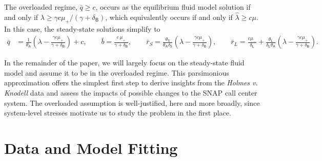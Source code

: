 \documentclass[manuscript,screen,authorversion]{acmart}
\newcommand{\tr}{\textcolor{red}}
\begin{document}
\begin{corollary}\label{overCor}
The overloaded regime, $\bar{q} \geq c$, occurs as the equilibrium fluid model solution if and only if $\lambda \geq {\gamma c \mu_{\mathsf{+}}}/({\gamma + \delta_\mathsf{B}})$, which equivalently occurs if and only if $\hat{\lambda} \geq c\mu$. In this case, the steady-state solutions simplify to
\begin{align}
\bar{q}
&= \frac{1}{\theta_{\mathsf{A}}}
\left(\lambda - \frac{\gamma c\mu_{\mathsf{+}} }{\gamma + \delta_{\mathsf{B}}}\right) 
+ c, \qquad 
\bar{b}
= \frac{c\,\mu_{\mathsf{+}}}{\gamma + \delta_{\mathsf{B}}}, 
\qquad 
\bar{r}_S = \frac{\theta_{\mathsf{S}}}{\theta_{\mathsf{A}} \delta_{\mathsf{S}}}
\left(\lambda - \frac{\gamma c\mu_{\mathsf{+}} }{\gamma + \delta_{\mathsf{B}}}\right) ,
\qquad 
\bar{r}_L= \frac{c\mu_{\mathsf{-}}}{\delta_{\mathsf{L}}}
+ \frac{\theta_{\mathsf{L}}}{\delta_{\mathsf{L}} \theta_{\mathsf{A}}}
\left(\lambda - \frac{\gamma c\mu_{\mathsf{+}} }{\gamma + \delta_{\mathsf{B}}}\right) .\label{eqn-steady-state-simplified}
\end{align}
\end{corollary}


In the remainder of the paper, we will largely focus on the steady-state fluid model and assume it to be in the overloaded regime. This parsimonious approximation offers the simplest first step to derive insights from the \emph{Holmes v. Knodell} data and assess the impacts of possible changes to the SNAP call center system. %
The overloaded assumption is well-justified, here and more broadly, since system-level stresses motivate us to study the problem in the first place.
 
\section{Data and Model Fitting}
\end{document}
